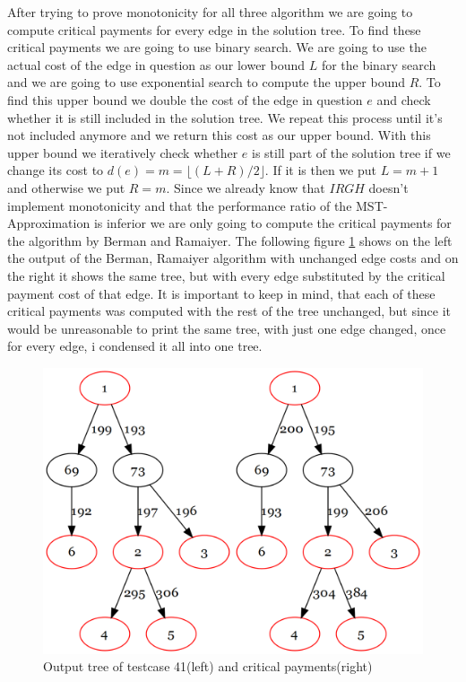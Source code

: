 After trying to prove monotonicity for all three algorithm we are going to compute critical payments for every edge in the solution tree. To find these critical payments we are going to use binary search. We are going to use the actual cost of the edge in question as our lower bound $L$ for the binary search and we are going to use exponential search to compute the upper bound $R$. 
To find this upper bound we double the cost of the edge in question $e$ and check whether it is still included in the solution tree. We repeat this process until it's not included anymore and we return this cost as our upper bound. With this upper bound we iteratively check whether $e$ is still part of the solution tree if we change its cost to $d(e)=m=\lfloor (L+R)/2\rfloor$. If it is then we put $L=m+1$ and otherwise we put $R=m$. Since we already know that $IRGH$ doesn't implement monotonicity and that the performance ratio of the MST-Approximation is inferior we are only going to compute the critical payments for the algorithm by Berman and Ramaiyer. The following figure \ref{fig:crit41} shows on the left the output of the Berman, Ramaiyer algorithm with unchanged edge costs and on the right it shows the same tree, but with every edge substituted by the critical payment cost of that edge. It is important to keep in mind, that each of these critical payments was computed with the rest of the tree unchanged, but since it would be unreasonable to print the same tree, with just one edge changed, once for every edge, i condensed it all into one tree. 

\begin{figure}[h]
\centering
\includegraphics[scale=0.25]{figures/crit.png}
\caption{Output tree of testcase 41(left) and critical payments(right)}\label{fig:crit41}
\end{figure}
 
